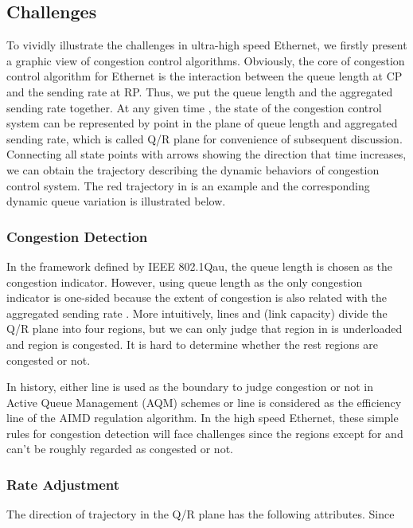 \documentclass{sig-alternate-10pt}
\begin{document}
\subsection{Challenges}
To vividly illustrate the challenges in ultra-high speed Ethernet, we firstly present a graphic view of congestion control algorithms. Obviously, the core of congestion control algorithm for Ethernet is the interaction between the queue length at CP and the sending rate at RP. Thus, we put the queue length  and the aggregated sending rate  together. At any given time , the state of the congestion control system can be represented by point  in the plane of queue length and aggregated sending rate, which is called Q/R plane for convenience of subsequent discussion. Connecting all state points with arrows showing the direction that time  increases, we can obtain the trajectory describing the dynamic behaviors of congestion control system. The red trajectory in  is an example and the corresponding dynamic queue variation is illustrated below.


\subsubsection{Congestion Detection}
In the framework defined by IEEE 802.1Qau, the queue length is chosen as the congestion indicator. However, using queue length as the only congestion indicator is one-sided because the extent of congestion is also related with the aggregated sending rate . More intuitively, lines  and  (link capacity) divide the Q/R plane into four regions, but we can only judge that region  in  is underloaded and region  is congested. It is hard to determine whether the rest regions are congested or not.

In history, either line  is used as the boundary to judge congestion or not in Active Queue Management (AQM) schemes or line  is considered as the efficiency line of the AIMD regulation algorithm. In the high speed Ethernet, these simple rules for congestion detection will face challenges since the regions except for  and  can't be roughly regarded as congested or not. 



\subsubsection{Rate Adjustment}
The direction of trajectory in the Q/R plane has the following attributes. Since 
\end{document}
